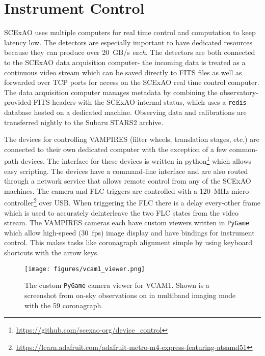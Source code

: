 \section{Instrument Control}\label{sec:control}

SCExAO uses multiple computers for real time control and computation to keep latency low. The detectors are especially important to have dedicated resources because they can produce over \SI{20}{GB/s} \textit{each}. The detectors are both connected to the SCExAO data acquisition computer- the incoming data is treated as a continuous video stream which can be saved directly to FITS files as well as forwarded over TCP ports for access on the SCExAO real time control computer. The data acquisition computer manages metadata by combining the observatory-provided FITS headers with the SCExAO internal status, which uses a \texttt{redis} database hosted on a dedicated machine. Observing data and calibrations are transferred nightly to the Subaru STARS2 archive.

The devices for controlling VAMPIRES (filter wheels, translation stages, etc.) are connected to their own dedicated computer with the exception of a few common-path devices. The interface for these devices is written in python\footnote{\url{https://github.com/scexao-org/device_control}} which allows easy scripting. The devices have a command-line interface and are also routed through a network service that allows remote control from any of the SCExAO machines. The camera and FLC triggers are controlled with a \SI{120}{\mega\hertz} micro-controller\footnote{\url{https://learn.adafruit.com/adafruit-metro-m4-express-featuring-atsamd51}} over USB. When triggering the FLC there is a delay every-other frame which is used to accurately deinterleave the two FLC states from the video stream. The VAMPIRES cameras each have custom viewers written in \texttt{PyGame} which allow high-speed (\SI{30}{fps}) image display and have bindings for instrument control. This makes tasks like coronagraph alignment simple by using keyboard shortcuts with the arrow keys.

\begin{figure}
    \centering
    \texttt{[image: figures/vcam1\_viewer.png]}
    \caption{The custom \texttt{PyGame} camera viewer for VCAM1. Shown is a screenshot from on-sky observations on  in multiband imaging mode with the \SI{59}{\mas} coronagraph.}
    \label{fig:vcam1}
\end{figure}

